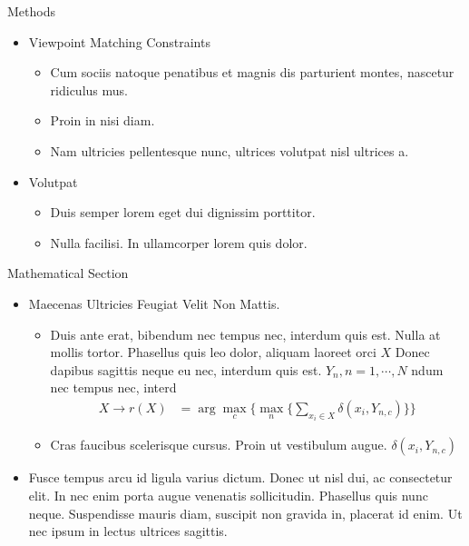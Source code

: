 \documentclass[final,hyperref={pdfpagelabels=false}]{beamer}
\begin{document}
\begin{frame}[t]
\begin{columns}[t]
\begin{column}{.32\textwidth}
\begin{block}{Methods}
\begin{itemize}
    \item Viewpoint Matching Constraints
      \begin{itemize}
      \item Cum sociis natoque penatibus et magnis dis parturient
        montes, nascetur ridiculus mus.
      \item Proin in nisi diam.
      \item Nam ultricies pellentesque nunc, ultrices volutpat nisl
        ultrices a.
      \end{itemize}


    \item Volutpat
      \begin{itemize}
      \item Duis semper lorem eget dui dignissim porttitor.
      \item Nulla facilisi. In ullamcorper lorem quis dolor.
      \end{itemize}
    \end{itemize}

  \end{block}


  \begin{block}{Mathematical Section}

    \begin{itemize}
    \item Maecenas Ultricies Feugiat Velit Non Mattis.
      \begin{itemize}
      \item Duis ante erat, bibendum nec tempus nec, interdum quis
        est. Nulla at mollis tortor. Phasellus quis leo dolor, aliquam
        laoreet orci $X$ Donec dapibus sagittis neque eu nec, interdum
        quis est. $Y_n, n=1,\cdots,N$ ndum nec tempus nec, interd
        \begin{align*}
          X \rightarrow r(X) & = \arg \max_{c} \Big\{ \max_n \big\{ \sum_{x_i \in X} \delta(x_i,Y_{n,c})\big\} \Big\} 
        \end{align*}
      \item Cras faucibus scelerisque cursus. Proin ut vestibulum
        augue. $\delta(x_i,Y_{n,c})$
      \end{itemize}
    \item Fusce tempus arcu id ligula varius dictum. Donec ut nisl
      dui, ac consectetur elit. In nec enim porta augue venenatis
      sollicitudin. Phasellus quis nunc neque. Suspendisse mauris
      diam, suscipit non gravida in, placerat id enim. Ut nec ipsum in
      lectus ultrices sagittis.
    \end{itemize}


\end{block}
\end{column}
\end{columns}
\end{frame}
\end{document}
